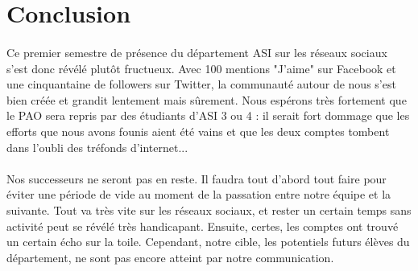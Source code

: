 \section{Conclusion}

\paragraph{}
Ce premier semestre de présence du département ASI sur les réseaux sociaux s'est donc révélé plutôt fructueux. Avec 100 mentions "J'aime" sur Facebook et une cinquantaine de followers sur Twitter, la communauté autour de nous s'est bien créée et grandit lentement mais sûrement. Nous espérons très fortement que le PAO sera repris par des étudiants d'ASI 3 ou 4 : il serait fort dommage que les efforts que nous avons founis aient été vains et que les deux comptes tombent dans l'oubli des tréfonds d'internet...

\paragraph{}
Nos successeurs ne seront pas en reste. Il faudra tout d'abord tout faire pour éviter une période de vide au moment de la passation entre notre équipe et la suivante. Tout va très vite sur les réseaux sociaux, et rester un certain temps sans activité peut se révélé très handicapant. Ensuite, certes, les comptes ont trouvé un certain écho sur la toile. Cependant, notre cible, les potentiels futurs élèves du département, ne sont pas encore atteint par notre communication. 